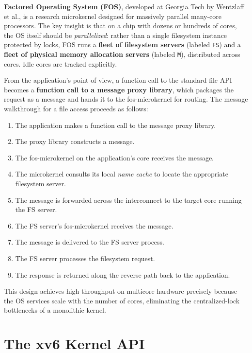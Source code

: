 \documentclass[11pt]{article}
\begin{document}
\textbf{Factored Operating System (FOS)}, developed at Georgia Tech by Wentzlaff et al., is a research microkernel designed for massively parallel many-core processors. The key insight is that on a chip with dozens or hundreds of cores, the OS itself should be \emph{parallelized}: rather than a single filesystem instance protected by locks, FOS runs a \textbf{fleet of filesystem servers} (labeled \texttt{FS}) and a \textbf{fleet of physical memory allocation servers} (labeled \texttt{M}), distributed across cores. Idle cores are tracked explicitly.

From the application's point of view, a function call to the standard file API becomes a \textbf{function call to a message proxy library}, which packages the request as a message and hands it to the fos-microkernel for routing. The message walkthrough for a file access proceeds as follows:

\begin{enumerate}
    \item The application makes a function call to the message proxy library.
    \item The proxy library constructs a message.
    \item The fos-microkernel on the application's core receives the message.
    \item The microkernel consults its local \emph{name cache} to locate the appropriate filesystem server.
    \item The message is forwarded across the interconnect to the target core running the FS server.
    \item The FS server's fos-microkernel receives the message.
    \item The message is delivered to the FS server process.
    \item The FS server processes the filesystem request.
    \item The response is returned along the reverse path back to the application.
\end{enumerate}

This design achieves high throughput on multicore hardware precisely because the OS services scale with the number of cores, eliminating the centralized-lock bottlenecks of a monolithic kernel.

\section{The xv6 Kernel API}
\end{document}
